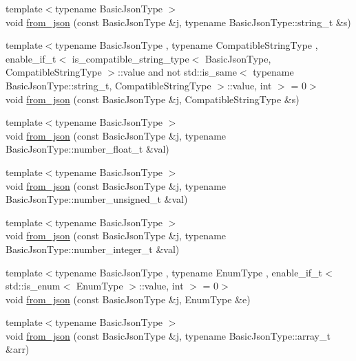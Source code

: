 \begin{DoxyCompactItemize}
\item 
{\footnotesize template$<$typename Basic\+Json\+Type $>$ }\\void \hyperlink{namespacenlohmann_1_1detail_ad74d89f77ada7a57eff38b43d4bf2335}{from\+\_\+json} (const Basic\+Json\+Type \&j, typename Basic\+Json\+Type\+::string\+\_\+t \&s)
\item 
{\footnotesize template$<$typename Basic\+Json\+Type , typename Compatible\+String\+Type , enable\+\_\+if\+\_\+t$<$ is\+\_\+compatible\+\_\+string\+\_\+type$<$ Basic\+Json\+Type, Compatible\+String\+Type $>$\+::value and not std\+::is\+\_\+same$<$ typename Basic\+Json\+Type\+::string\+\_\+t, Compatible\+String\+Type $>$\+::value, int $>$  = 0$>$ }\\void \hyperlink{namespacenlohmann_1_1detail_a87c6703c031f86b349cccb486c5730f7}{from\+\_\+json} (const Basic\+Json\+Type \&j, Compatible\+String\+Type \&s)
\item 
{\footnotesize template$<$typename Basic\+Json\+Type $>$ }\\void \hyperlink{namespacenlohmann_1_1detail_a7cb5dd7d46a60e65f9a8e0873b3f7dd8}{from\+\_\+json} (const Basic\+Json\+Type \&j, typename Basic\+Json\+Type\+::number\+\_\+float\+\_\+t \&val)
\item 
{\footnotesize template$<$typename Basic\+Json\+Type $>$ }\\void \hyperlink{namespacenlohmann_1_1detail_ace4d5680ba413d9fd897ccb5d9c61a1c}{from\+\_\+json} (const Basic\+Json\+Type \&j, typename Basic\+Json\+Type\+::number\+\_\+unsigned\+\_\+t \&val)
\item 
{\footnotesize template$<$typename Basic\+Json\+Type $>$ }\\void \hyperlink{namespacenlohmann_1_1detail_a047d881e611fcac709dc318f730a1732}{from\+\_\+json} (const Basic\+Json\+Type \&j, typename Basic\+Json\+Type\+::number\+\_\+integer\+\_\+t \&val)
\item 
{\footnotesize template$<$typename Basic\+Json\+Type , typename Enum\+Type , enable\+\_\+if\+\_\+t$<$ std\+::is\+\_\+enum$<$ Enum\+Type $>$\+::value, int $>$  = 0$>$ }\\void \hyperlink{namespacenlohmann_1_1detail_a5440d650150d01e8015133521351b459}{from\+\_\+json} (const Basic\+Json\+Type \&j, Enum\+Type \&e)
\item 
{\footnotesize template$<$typename Basic\+Json\+Type $>$ }\\void \hyperlink{namespacenlohmann_1_1detail_abc62958462b916726b89f25fa381a129}{from\+\_\+json} (const Basic\+Json\+Type \&j, typename Basic\+Json\+Type\+::array\+\_\+t \&arr)

\end{DoxyCompactItemize}
